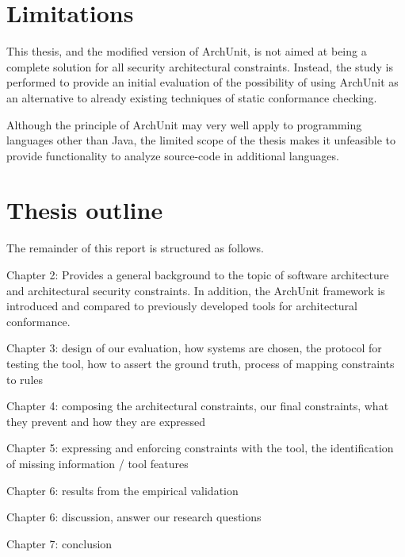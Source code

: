 \section{Limitations}
\label{sec:limitations}

This thesis, and the modified version of ArchUnit, is not aimed at being a complete solution for all security architectural constraints. Instead, the study is performed to provide an initial evaluation of the possibility of using ArchUnit as an alternative to already existing techniques of static conformance checking. 

Although the principle of ArchUnit may very well apply to programming languages other than Java, the limited scope of the thesis makes it unfeasible to provide functionality to analyze source-code in additional languages.

\section{Thesis outline}

The remainder of this report is structured as follows.

Chapter 2: Provides a general background to the topic of software architecture and architectural security constraints. In addition, the ArchUnit framework is introduced and compared to previously developed tools for architectural conformance.  

Chapter 3:
design of our evaluation,
how systems are chosen,
the protocol for testing the tool,
how to assert the ground truth,
process of mapping constraints to rules

Chapter 4:
composing the architectural constraints,
our final constraints, what they prevent and how they are expressed


Chapter 5:
expressing and enforcing constraints with the tool,
the identification of missing information / tool features

Chapter 6:
results from the empirical validation

Chapter 6:
discussion,
answer our research questions

Chapter 7:
conclusion